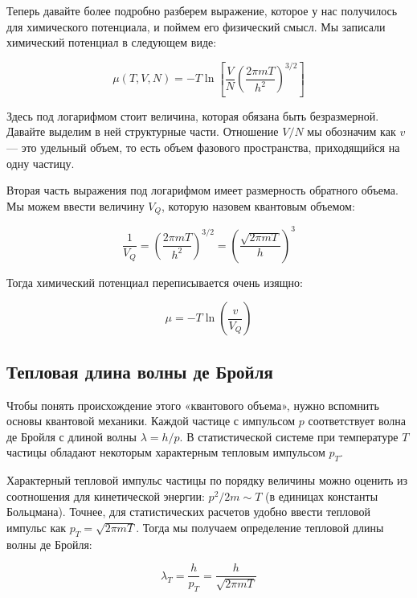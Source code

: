 \documentclass[../general/general]{subfiles}
\begin{document}
Теперь давайте более подробно разберем выражение, которое у нас получилось для химического потенциала, и поймем его физический смысл. Мы записали химический потенциал в следующем виде:

\begin{equation}
\mu(T, V, N) = -T \ln \left[ \frac{V}{N} \left( \frac{2\pi m T}{h^2} \right)^{3/2} \right]
\end{equation}

Здесь под логарифмом стоит величина, которая обязана быть безразмерной. Давайте выделим в ней структурные части. Отношение $V/N$ мы обозначим как $v$ — это удельный объем, то есть объем фазового пространства, приходящийся на одну частицу. 

Вторая часть выражения под логарифмом имеет размерность обратного объема. Мы можем ввести величину $V_Q$, которую назовем квантовым объемом:

\begin{equation}
\frac{1}{V_Q} = \left( \frac{2\pi m T}{h^2} \right)^{3/2} = \left( \frac{\sqrt{2\pi m T}}{h} \right)^{3}
\end{equation}

Тогда химический потенциал переписывается очень изящно:

\begin{equation}
\mu = -T \ln \left( \frac{v}{V_Q} \right)
\end{equation}

\subsection{Тепловая длина волны де Бройля}

Чтобы понять происхождение этого «квантового объема», нужно вспомнить основы квантовой механики. Каждой частице с импульсом $p$ соответствует волна де Бройля с длиной волны $\lambda = h/p$. В статистической системе при температуре $T$ частицы обладают некоторым характерным тепловым импульсом $p_T$.

Характерный тепловой импульс частицы по порядку величины можно оценить из соотношения для кинетической энергии: $p^2/2m \sim T$ (в единицах константы Больцмана). Точнее, для статистических расчетов удобно ввести тепловой импульс как $p_T = \sqrt{2\pi m T}$. Тогда мы получаем определение тепловой длины волны де Бройля:

\begin{equation}
\lambda_T = \frac{h}{p_T} = \frac{h}{\sqrt{2\pi m T}}
\end{equation}
\end{document}
